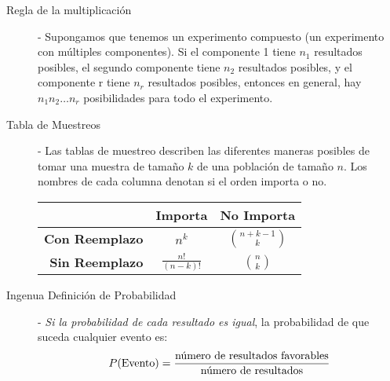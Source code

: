 \documentclass[10pt,landscape]{article}
\begin{document}
\begin{multicols}{3}
\begin{description}
    \item[Regla de la multiplicación] - Supongamos que tenemos un experimento compuesto (un experimento con múltiples componentes). Si el componente 1 tiene $n_1$ resultados posibles, el segundo componente tiene $n_2$ resultados posibles, y el componente r tiene $n_r$ resultados posibles, entonces en general, hay $n_1 n_2 \dots n_r$ posibilidades para todo el experimento.
    \item[Tabla de Muestreos] - Las tablas de muestreo describen las diferentes maneras posibles de tomar una muestra de tamaño $k$ de una población de tamaño $n$. Los nombres de cada columna denotan si el orden importa o no.\\
        \begin{center}
            \begin{tabular}{r|cc}
                 & \textbf{Importa} & \textbf{No Importa} \\ \hline
                \textbf{Con Reemplazo} & $\displaystyle n^k$ & $\displaystyle{n+k-1 \choose k}$ \\
                \textbf{Sin Reemplazo} & $\displaystyle\frac{n!}{(n - k)!}$ & $\displaystyle{n \choose k}$
            \end{tabular}
        \end{center}
    \item[Ingenua Definición de Probabilidad] - \emph{Si la probabilidad de cada resultado es igual}, la probabilidad de que suceda cualquier evento es:
        \[P(\textnormal{Evento}) = \frac{\textnormal{número de resultados favorables}}{\textnormal{número de resultados}}\]
\end{description}


\end{multicols}
\end{document}
